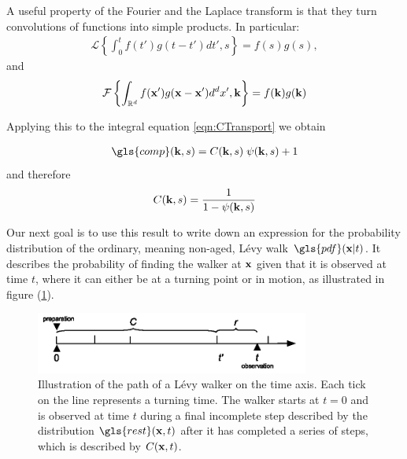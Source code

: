 A useful property of the Fourier and the Laplace transform is that they turn convolutions of functions into simple products. In particular:
%
\begin{align}
\mathcal{L} \left\{ \int_{0}^{t} f(t') g(t-t') dt', s \right\} = f(s) g(s) , \label{eqn:LConvolution}
\end{align}
%
and 
%
\begin{align}
\mathcal{F} \left\{ \int_{\mathbb{R}^{d}} f(\mathbf{ x }') g(\mathbf{ x } - \mathbf{ x }') d^{d}x' , \mathbf{ k } \right\} = f(\mathbf{ k }) g(\mathbf{ k })  \label{eqn:FConvolution}
\end{align}

Applying this to the integral equation \ref{eqn:CTransport} we obtain 

\begin{align}
\gls{comp}(\ve{k},s) =  C(\ve{k},s)  \; \psi(\ve{k},s) + 1
\end{align}
%
and therefore 
%
\begin{align}
C(\mathbf{ k },s) = \frac{1}{1 - \psi(\mathbf{ k },s)} \label{eqn:CFourierLaplace}
\end{align}

Our next goal is to use this result to write down an expression for the probability distribution of the ordinary, meaning non-aged, L\'evy walk $\gls{pdf}(\ve{x}|t)$. It describes the probability of finding the walker at $\mathbf{ x }$ given that it is observed at time $t$, where it can either be at a turning point or in motion, as illustrated in figure (\ref{fig:pdfOrdinary}). 

\begin{figure}
\begin{center}
\includegraphics[width=90mm]{pics/pdfOrdinary.png}
\caption{Illustration of the path of a L\'evy walker on the time axis. Each tick on the line represents a turning time. The walker starts at $t=0$ and is observed at time $t$ during a final incomplete step described by the distribution $\gls{rest}(\ve{x},t)$ after it has completed a series of steps, which is described by $C(\mathbf{ x },t)$. 
\label{fig:pdfOrdinary}}
\end{center}
\end{figure}

